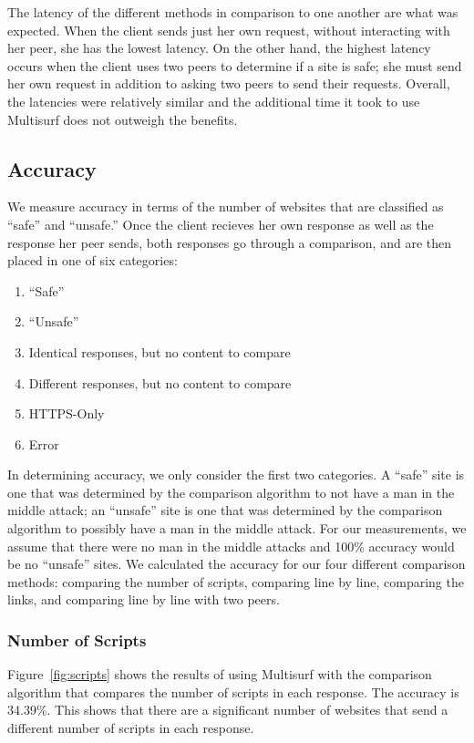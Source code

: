 The latency of the different methods in comparison to one another are what was expected.  When the client sends just her own request, without interacting with her peer, she has the lowest latency.  On the other hand, the highest latency occurs when the client uses two peers to determine if a site is safe; she must send her own request in addition to asking two peers to send their requests.  Overall, the latencies were relatively similar and the additional time it took to use Multisurf does not outweigh the benefits.  

\subsection{Accuracy}
We measure accuracy in terms of the number of websites that are classified as ``safe'' and ``unsafe.''  Once the client recieves her own response as well as the response her peer sends, both responses go through a comparison, and are then placed in one of six categories:

\begin{enumerate}
\item ``Safe''
\item ``Unsafe''
\item Identical responses, but no content to compare
\item Different responses, but no content to compare
\item HTTPS-Only
\item Error
\end{enumerate}

In determining accuracy, we only consider the first two categories.  A ``safe'' site is one that was determined by the comparison algorithm to not have a man in the middle attack; an ``unsafe'' site is one that was determined by the comparison algorithm to possibly have a man in the middle attack.  For our measurements, we assume that there were no man in the middle attacks and 100\% accuracy would be no ``unsafe'' sites.  We calculated the accuracy for our four different comparison methods: comparing the number of scripts, comparing line by line, comparing the links, and comparing line by line with two peers.

\subsubsection{Number of Scripts}
Figure~\ref{fig:scripts} shows the results of using Multisurf with the comparison algorithm that compares the number of scripts in each response.  The accuracy is 34.39\%.  This shows that there are a significant number of websites that send a different number of scripts in each response.

